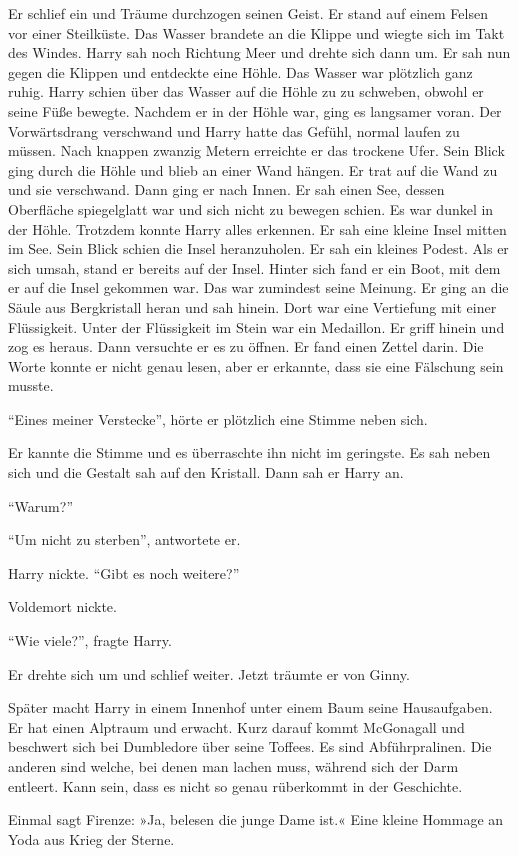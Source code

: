 \begin{traum}
Er schlief ein und Träume durchzogen seinen Geist. Er stand auf einem Felsen vor einer Steilküste. Das Wasser brandete an die Klippe und wiegte sich im Takt des Windes. Harry sah noch Richtung Meer und drehte sich dann um. Er sah nun gegen die Klippen und entdeckte eine Höhle. Das Wasser war plötzlich ganz ruhig. Harry schien über das Wasser auf die Höhle zu zu schweben, obwohl er seine Füße bewegte. Nachdem er in der Höhle war, ging es langsamer voran. Der Vorwärtsdrang verschwand und Harry hatte das Gefühl, normal laufen zu müssen. Nach knappen zwanzig Metern erreichte er das trockene Ufer. Sein Blick ging durch die Höhle und blieb an einer Wand hängen. Er trat auf die Wand zu und sie verschwand. Dann ging er nach Innen. Er sah einen See, dessen Oberfläche spiegelglatt war und sich nicht zu bewegen schien. Es war dunkel in der Höhle. Trotzdem konnte Harry alles erkennen. Er sah eine kleine Insel mitten im See. Sein Blick schien die Insel heranzuholen. Er sah ein kleines Podest. Als er sich umsah, stand er bereits auf der Insel. Hinter sich fand er ein Boot, mit dem er auf die Insel gekommen war. Das war zumindest seine Meinung. Er ging an die Säule aus Bergkristall heran und sah hinein. Dort war eine Vertiefung mit einer Flüssigkeit. Unter der Flüssigkeit im Stein war ein Medaillon. Er griff hinein und zog es heraus. Dann versuchte er es zu öffnen. Er fand einen Zettel darin. Die Worte konnte er nicht genau lesen, aber er erkannte, dass sie eine Fälschung sein musste.

\enquote{Eines meiner Verstecke}, hörte er plötzlich eine Stimme neben sich.

Er kannte die Stimme und es überraschte ihn nicht im geringste. Es sah neben sich und die Gestalt sah auf den Kristall. Dann sah er Harry an.

\enquote{Warum?}

\enquote{Um nicht zu sterben}, antwortete er.

Harry nickte. \enquote{Gibt es noch weitere?}

Voldemort nickte.

\enquote{Wie viele?}, fragte Harry.
\end{traum}

Er drehte sich um und schlief weiter. Jetzt träumte er von Ginny.




\begin{kommentar}
Später macht Harry in einem Innenhof unter einem Baum seine Hausaufgaben. Er hat einen Alptraum und erwacht. Kurz darauf kommt McGonagall und beschwert sich bei Dumbledore über seine Toffees. Es sind Abführpralinen. Die anderen sind welche, bei denen man lachen muss, während sich der Darm entleert. Kann sein, dass es nicht so genau rüberkommt in der Geschichte.
\end{kommentar}

\begin{kommentar}
Einmal sagt Firenze: »Ja, belesen die junge Dame ist.« Eine kleine Hommage an Yoda aus Krieg der Sterne.
\end{kommentar}
